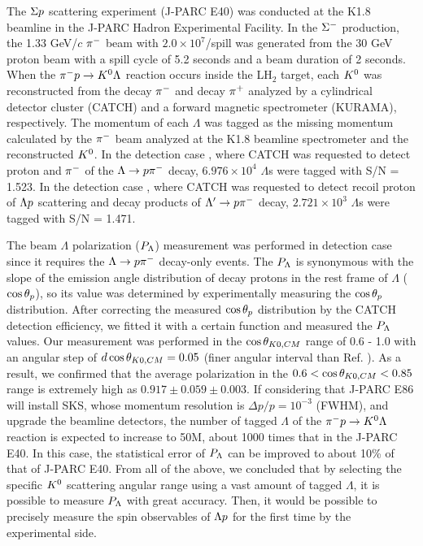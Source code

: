 The $\Sigma p$ scattering experiment (J-PARC E40) \cite{Miwa-AIP2019} \cite{Miwa-JP2020} was conducted at the K1.8 beamline in the J-PARC Hadron Experimental Facility. In the $\Sigma^{-}$ production, the 1.33 GeV/$c$ $\pi^{-}$ beam with $2.0\times10^{7}$/spill was generated from the 30 GeV proton beam with a spill cycle of 5.2 seconds and a beam duration of 2 seconds. When the $\pi^- p \to K^0 \Lambda$ reaction occurs inside the LH$_{2}$ target, each $K^{0}$ was reconstructed from the decay $\pi^{-}$ and decay $\pi^{+}$ analyzed by a cylindrical detector cluster (CATCH) and a forward magnetic spectrometer (KURAMA), respectively. The momentum of each $\Lambda$ was tagged as the missing momentum calculated by the $\pi^{-}$ beam analyzed at the K1.8 beamline spectrometer \cite{K1.8} and the reconstructed $K^{0}$. In the detection case , where CATCH was requested to detect proton and $\pi^{-}$ of the $\Lambda\to p\pi^{-}$ decay, $6.976\times10^{4}$ $\Lambda$s were tagged with S/N = 1.523. In the detection case , where CATCH was requested to detect recoil proton of $\Lambda p$ scattering and decay products of $\Lambda'\to p\pi^{-}$ decay, $2.721\times10^{3}$ $\Lambda$s were tagged with S/N = 1.471. 

The beam $\Lambda$ polarization ($P_{\Lambda}$) measurement was performed in detection case  since it requires the $\Lambda\to p\pi^{-}$ decay-only events. The $P_{\Lambda}$ is synonymous with the slope of the emission angle distribution of decay protons in the rest frame of $\Lambda$ ($\cos{\theta_p}$), so its value was determined by experimentally measuring the $\cos{\theta_p}$ distribution. After correcting the measured $\cos{\theta_p}$ distribution by the CATCH detection efficiency, we fitted it with a certain function and measured the $P_{\Lambda}$ values. Our measurement was performed in the $\cos{\theta_{K0,CM}}$ range of 0.6 - 1.0 with an angular step of $d\cos{\theta_{K0,CM}}=0.05$ (finer angular interval than Ref. \cite{Baker}). As a result, we confirmed that the average polarization in the $0.6<\cos{\theta_{K0,CM}}<0.85$ range is extremely high as $0.917\pm0.059\pm0.003$. If considering that J-PARC E86 will install SKS, whose momentum resolution is $\Delta p/p = 10^{-3}$ (FWHM), and upgrade the beamline detectors, the number of tagged $\Lambda$ of the $\pi^- p \to K^0 \Lambda$ reaction is expected to increase to 50M, about 1000 times that in the J-PARC E40. In this case, the statistical error of $P_{\Lambda}$ can be improved to about 10\% of that of J-PARC E40. From all of the above, we concluded that by selecting the specific $K^{0}$ scattering angular range using a vast amount of tagged $\Lambda$, it is possible to measure $P_{\Lambda}$ with great accuracy. Then, it would be possible to precisely measure the spin observables of $\Lambda p$ for the first time by the experimental side.

